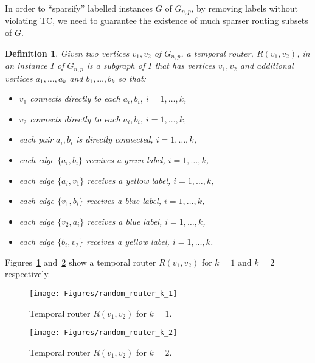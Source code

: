 \documentclass[a4paper,UKenglish]{article}
\newtheorem{definition}{Definition}
\begin{document}
In order to ``sparsify'' labelled instances $G$ of $G_{n,p}$, by removing labels without violating TC, we need to guarantee the existence of much sparser routing subsets of $G$.

\begin{definition}
Given two vertices $v_1,v_2$ of $G_{n,p}$, a \emph{temporal router, $R(v_1,v_2)$, in an instance $I$ of $G_{n,p}$} is a subgraph of $I$ that has vertices $v_1,v_2$ and additional vertices $a_1,\ldots, a_k$ and $b_1, \ldots, b_k$ so that:
\begin{itemize}
\item $v_1$ connects directly to each $a_i,b_i,~i=1,\ldots, k$,
\item $v_2$ connects directly to each $a_i,b_i,~i=1,\ldots, k$,
\item each pair $a_i,b_i$ is directly connected, $i=1,\ldots, k$,
\item each edge $\{a_i,b_i\}$ receives a green label, $i=1,\ldots, k$,
\item each edge $\{a_i,v_1\}$ receives a yellow label, $i=1,\ldots, k$,
\item each edge $\{v_1,b_i\}$ receives a blue label, $i=1,\ldots, k$,
\item each edge $\{v_2,a_i\}$ receives a blue label, $i=1,\ldots, k$,
\item each edge $\{b_i,v_2\}$ receives a yellow label, $i=1,\ldots, k$.
\end{itemize}
\end{definition}

Figures~\ref{fig:random_router_k_1} and~\ref{fig:random_router_k_2} show a temporal router $R(v_1,v_2)$ for $k=1$ and $k=2$ respectively.
\begin{figure}[!htb]
\centering
\texttt{[image: Figures/random\_router\_k\_1]}
\caption{Temporal router $R(v_1,v_2)$ for $k=1$.}
\label{fig:random_router_k_1}
\end{figure}

\begin{figure}[!htb]
\centering
\texttt{[image: Figures/random\_router\_k\_2]}
\caption{Temporal router $R(v_1,v_2)$ for $k=2$.}
\label{fig:random_router_k_2}
\end{figure}
\end{document}
